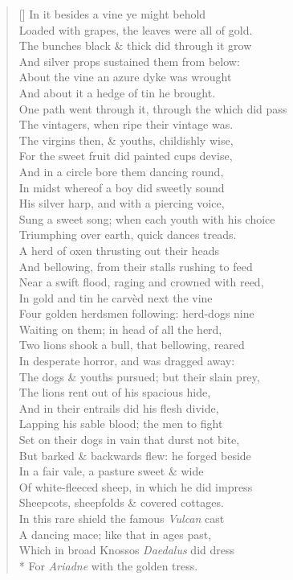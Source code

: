 \documentclass[MAIN]{subfiles}
\begin{document}
\begin{verse}[\versewidth]
In it besides a vine ye might behold\\
Loaded with grapes, the leaves were all of gold.\\
The bunches black \& thick did through it grow\\
And silver props sustained them from below:\\
About the vine an azure dyke was wrought\\
And about it a hedge of tin he brought.\\
One path went through it, through the which did pass\\
The vintagers, when ripe their vintage was.\\
The virgins then, \& youths, childishly wise,\\
For the sweet fruit did painted cups devise,\\
And in a circle bore them dancing round,\\
In midst whereof a boy did sweetly sound\\
His silver harp, and with a piercing voice,\\
Sung a sweet song; when each youth with his choice\\
Triumphing over earth, quick dances treads.\\
A herd of oxen thrusting out their heads\\
And bellowing, from their stalls rushing to feed\\
Near a swift flood, raging and crowned with reed,\\ 
In gold and tin he carv\`ed next the vine\\
Four golden herdsmen following: herd-dogs nine\\
Waiting on them; in head of all the herd,\\
Two lions shook a bull, that bellowing, reared\\
In desperate horror, and was dragged away:\\
The dogs \& youths pursued; but their slain prey,\\
The lions rent out of his spacious hide,\\
And in their entrails did his flesh divide,\\
Lapping his sable blood; the men to fight\\
Set on their dogs in vain that durst not bite,\\
But barked \& backwards flew: he forged beside\\
In a fair vale, a pasture sweet \& wide\\
Of white-fleeced sheep, in which he did impress\\
Sheepcots, sheepfolds \& covered cottages.\\
In this rare shield the famous \emph{Vulcan} cast\\
A dancing mace; like that in ages past,\\
Which in broad {\sc Knossos} \emph{Daedalus} did dress\\*
For \emph{Ariadne} with the golden tress.
\end{verse}
\end{document}

